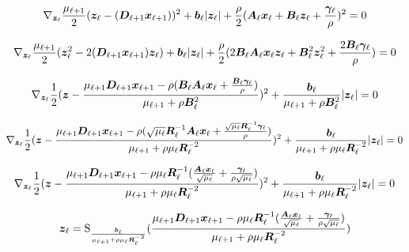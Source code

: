 \documentclass{article}
\begin{document}
\begin{equation}
\nabla_{\bm{z}_{\ell}} \frac{\mu_{\ell + 1}}{2}(\bm{z}_{\ell} - (\bm{D}_{\ell + 1}\bm{x}_{\ell + 1}))^2 + \bm{b}_{\ell}|\bm{z}_{\ell}| + \frac{\rho}{2} (\bm{A}_{\ell}\bm{x}_{\ell} + \bm{B}_{\ell}\bm{z}_{\ell} + \frac{\bm{\gamma}_{\ell}}{\rho})^2 = 0
\end{equation}

\begin{equation}
\nabla_{\bm{z}_{\ell}} \frac{\mu_{\ell + 1}}{2}(\bm{z}_{\ell}^2 - 2(\bm{D}_{\ell + 1}\bm{x}_{\ell + 1})\bm{z}_{\ell}) + \bm{b}_{\ell}|\bm{z}_{\ell}| + \frac{\rho}{2} (2\bm{B}_{\ell}\bm{A}_{\ell}\bm{x}_{\ell}\bm{z}_{\ell} + \bm{B}_{\ell}^2\bm{z}_{\ell}^2 + \frac{2\bm{B}_{\ell}\bm{\gamma}_{\ell}}{\rho}) = 0
\end{equation}

\begin{equation}
\nabla_{\bm{z}_{\ell}} \frac{1}{2}(\bm{z} -\frac{\mu_{\ell + 1}\bm{D}_{\ell + 1}\bm{x}_{\ell + 1} - \rho(\bm{B}_{\ell}\bm{A}_{\ell}\bm{x}_{\ell} + \frac{\bm{B}_{\ell}\bm{\gamma}_{\ell}}{\rho})}{\mu_{\ell + 1} + \rho\bm{B}_{\ell}^2})^2 + \frac{\bm{b}_{\ell}}{\mu_{\ell + 1} + \rho\bm{B}_{\ell}^2}|\bm{z}_{\ell}| = 0
\end{equation}

\begin{equation}
\nabla_{\bm{z}_{\ell}} \frac{1}{2}(\bm{z} -\frac{\mu_{\ell + 1}\bm{D}_{\ell + 1}\bm{x}_{\ell + 1} - \rho(\sqrt{\mu_{\ell}}\bm{R}_{\ell}^{-1}\bm{A}_{\ell}\bm{x}_{\ell} + \frac{\sqrt{\mu_{\ell}}\bm{R}_{\ell}^{-1}\bm{\gamma}_{\ell}}{\rho})}{\mu_{\ell + 1} + \rho\mu_{\ell}\bm{R}_{\ell}^{-2}})^2 + \frac{\bm{b}_{\ell}}{\mu_{\ell + 1} + \rho\mu_{\ell}\bm{R}_{\ell}^{-2}}|\bm{z}_{\ell}| = 0
\end{equation}

\begin{equation}
\nabla_{\bm{z}_{\ell}} \frac{1}{2}(\bm{z} -\frac{\mu_{\ell + 1}\bm{D}_{\ell + 1}\bm{x}_{\ell + 1} - \rho\mu_{\ell}\bm{R}_{\ell}^{-1}(\frac{\bm{A}_{\ell}\bm{x}_{\ell}}{\sqrt{\mu_{\ell}}} + \frac{\bm{\gamma}_{\ell}}{\rho\sqrt{\mu_{\ell}}})}{\mu_{\ell + 1} + \rho\mu_{\ell}\bm{R}_{\ell}^{-2}})^2 + \frac{\bm{b}_{\ell}}{\mu_{\ell + 1} + \rho\mu_{\ell}\bm{R}_{\ell}^{-2}}|\bm{z}_{\ell}| = 0
\end{equation}

\begin{equation}
\bm{z}_{\ell} = \operatorname{S}_{\frac{\bm{b}_{\ell}}{\mu_{\ell + 1} + \rho\mu_{\ell}\bm{R}_{\ell}^{-2}}}(\frac{\mu_{\ell + 1}\bm{D}_{\ell + 1}\bm{x}_{\ell + 1} - \rho\mu_{\ell}\bm{R}_{\ell}^{-1}(\frac{\bm{A}_{\ell}\bm{x}_{\ell}}{\sqrt{\mu_{\ell}}} + \frac{\bm{\gamma}_{\ell}}{\rho\sqrt{\mu_{\ell}}})}{\mu_{\ell + 1} + \rho\mu_{\ell}\bm{R}_{\ell}^{-2}})
\end{equation}
\end{document}
